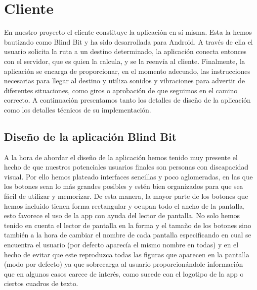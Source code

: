 


\section{Cliente}
\label{sec:cliente}
En nuestro proyecto el cliente constituye la aplicación en sí misma. Esta la hemos bautizado como Blind Bit y ha sido desarrollada para Android. A través de ella el usuario solicita la ruta a un destino determinado, la aplicación conecta entonces con el servidor, que es quien la calcula, y se la reenvía al cliente. Finalmente, la aplicación se encarga de proporcionar, en el momento adecuado, las instrucciones necesarias para llegar al destino y utiliza sonidos y vibraciones para advertir de diferentes situaciones, como giros o aprobación de que seguimos en el camino correcto. A continuación presentamos tanto los detalles de diseño de la aplicación como los detalles técnicos de su implementación. 


\subsection{Diseño de la aplicación Blind Bit}
\label{sub:diseño}

A la hora de abordar el diseño de la aplicación hemos tenido muy presente el hecho de que nuestros potenciales usuarios finales son personas con discapacidad visual. Por ello hemos plateado interfaces sencillas y poco aglomeradas, en las que los botones sean lo más grandes posibles y estén bien organizados para que sea fácil de utilizar y memorizar. De esta manera, la mayor parte de los botones que hemos incluido tienen forma rectangular y ocupan todo el ancho de la pantalla, esto favorece el uso de la app con ayuda del lector de pantalla. No solo hemos tenido en cuenta el lector de pantalla en la forma y el tamaño de los botones sino también a la hora de cambiar el nombre de cada pantalla especificando en cual se encuentra el usuario (por defecto aparecía el mismo nombre en todas) y en el hecho de evitar que este reproduzca todas las figuras que aparecen en la pantalla (modo por defecto) ya que sobrecarga al usuario proporcionándole información que en algunos casos carece de interés, como sucede con el logotipo de la app o ciertos cuadros de texto.

